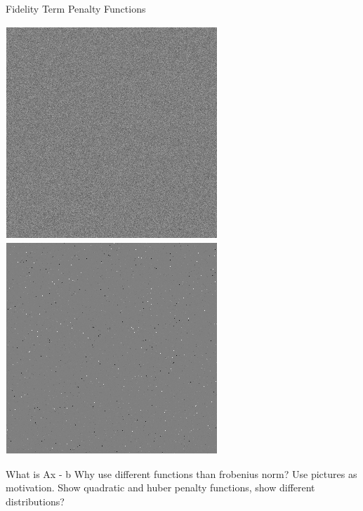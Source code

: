 \documentclass[12pt]{beamer}
\begin{document}
\begin{frame}{Fidelity Term Penalty Functions}
\begin{minipage}{0.45\textwidth}

\begin{center}
\vspace{-2 mm}
\includegraphics[scale=0.35]{gaussian_noise.png} \\
\includegraphics[scale=0.35]{student_t_noise.png} 
\end{center}

\end{minipage} \hfill
\begin{minipage}{0.52\textwidth}

What is Ax - b
Why use different functions than frobenius norm?  Use pictures as motivation. Show quadratic and huber penalty functions, show different distributions?

\end{minipage}
\end{frame}
\end{document}

